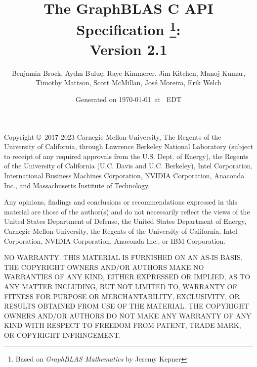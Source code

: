 \documentclass[11pt]{extbook}
\begin{document}

\title{
The GraphBLAS C API Specification
\footnote{Based on \emph{GraphBLAS Mathematics} by Jeremy Kepner}: \\ 
{\large Version 2.1} \\
}

\author{Benjamin Brock, Ayd\i n Bulu\c{c}, Raye Kimmerer, Jim Kitchen, Manoj Kumar, Timothy Mattson, Scott McMillan, Jos\'e Moreira, Erik Welch}

\date{Generated on \today\ at \currenttime\ EDT}

\maketitle


\renewcommand{\thefootnote}{\arabic{footnote}}
\setcounter{footnote}{0}

\vfill

Copyright \copyright\ 2017-2023 Carnegie Mellon University, The Regents
of the University of California, through Lawrence Berkeley National 
Laboratory (subject to receipt of any required approvals from the 
U.S. Dept. of Energy), the Regents of the University of California 
(U.C. Davis and U.C. Berkeley), Intel Corporation, International Business Machines 
Corporation, NVIDIA Corporation, Anaconda Inc., and Massachusetts Institute of Technology. 

Any opinions, findings and conclusions or recommendations expressed in 
this material are those of the author(s) and do not necessarily reflect 
the views of the United States Department of Defense, the United States 
Department of Energy, Carnegie Mellon University, the Regents of the 
University of California, Intel Corporation, NVIDIA Corporation, Anaconda Inc., or IBM Corporation.  

NO WARRANTY. THIS MATERIAL IS FURNISHED ON AN AS-IS BASIS. THE COPYRIGHT 
OWNERS AND/OR AUTHORS MAKE NO WARRANTIES OF ANY KIND, EITHER EXPRESSED 
OR IMPLIED, AS TO ANY MATTER INCLUDING, BUT NOT LIMITED TO, WARRANTY OF 
FITNESS FOR PURPOSE OR MERCHANTABILITY, EXCLUSIVITY, OR RESULTS OBTAINED 
FROM USE OF THE MATERIAL. THE COPYRIGHT OWNERS AND/OR AUTHORS DO NOT MAKE 
ANY WARRANTY OF ANY KIND WITH RESPECT TO FREEDOM FROM PATENT, TRADE MARK, 
OR COPYRIGHT INFRINGEMENT.

\vspace{1.5cm}

\vspace{2cm}
\end{document}
